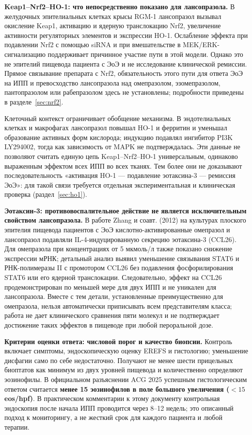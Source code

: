 \documentclass[11pt,a4paper,notitlepage]{report}
\newcommand{\src}[1]{\unskip\space\cite{#1}}
\begin{document}
\textbf{Keap1--Nrf2--HO-1: что непосредственно показано для лансопразола.} В желудочных эпителиальных клетках крысы RGM-1 лансопразол вызывал окисление Keap1, активацию и ядерную транслокацию Nrf2, увеличение активности регуляторных элементов и экспрессии HO-1. Ослабление эффекта при подавлении Nrf2 с помощью siRNA и при вмешательстве в MEK/ERK-сигнализацию поддерживает причинное участие пути в этой модели. Однако это не эпителий пищевода пациента с ЭоЭ и не исследование клинической ремиссии. Прямое связывание препарата с Nrf2, обязательность этого пути для ответа ЭоЭ на ИПП и превосходство лансопразола над омепразолом, эзомепразолом, пантопразолом или рабепразолом здесь не установлены; подробности приведены в разделе~\ref{sec:nrf2}.\src{molnrf2}

Клеточный контекст ограничивает обобщение механизма. В эндотелиальных клетках и макрофагах лансопразол повышал HO-1 и ферритин и уменьшал образование активных форм кислорода; индукцию подавлял ингибитор PI3K LY294002, тогда как зависимость от MAPK не подтверждалась. Эти данные не позволяют считать единую цепь Keap1--Nrf2--HO-1 универсальным, одинаково выраженным эффектом всех ИПП во всех тканях. Тем более они не доказывают последовательность «активация HO-1 --- подавление эотаксина-3 --- ремиссия ЭоЭ»: для такой связи требуется отдельная экспериментальная и клиническая проверка (раздел~\ref{sec:ho1}).\src{molho1,molnrf2}

\textbf{Эотаксин-3: противовоспалительное действие не является исключительным свойством лансопразола.} В работе Zhang и соавт. (2012) на культурах плоского эпителия пищевода пациентов с ЭоЭ кислотно-активированные омепразол и лансопразол подавляли IL-4-индуцированную секрецию эотаксина-3 (CCL26). Для омепразола при концентрациях от 5 мкмоль/л также показано снижение экспрессии мРНК; детальный анализ выявил уменьшение связывания STAT6 и РНК-полимеразы II с промотором CCL26 без подавления фосфорилирования STAT6 или его ядерной транслокации. Следовательно, эффект на CCL26 продемонстрирован по меньшей мере для двух ИПП и не уникален для лансопразола. Вместе с тем детали, установленные преимущественно для омепразола, нельзя автоматически приписывать всем представителям класса; работа не дает клинического сравнения пяти молекул и не подтверждает достижение таких эффектов в пищеводе при любой пероральной дозе.\src{eoestat6}

\textbf{Критерии оценки ответа: числовой порог и качество биопсии.} Контроль включает симптомы, эндоскопическую оценку EREFS и гистологию; уменьшение дисфагии само по себе недостаточно. Получают не менее шести прицельных биоптатов как минимум из двух уровней пищевода и количественно определяют эозинофилы. В официальном разъяснении ACG 2025 успешным гистологическим ответом считается \textbf{менее 15 эозинофилов в поле большого увеличения ($<15$ eos/hpf)}. В практическом комментарии к этому документу контрольная эндоскопия после начала ИПП проводится через 8--12 недель; это описанный подход к мониторингу, а не жесткий срок для каждого пациента и любой терапии.\src{eoeguide,eoehighlights2025}
\end{document}
